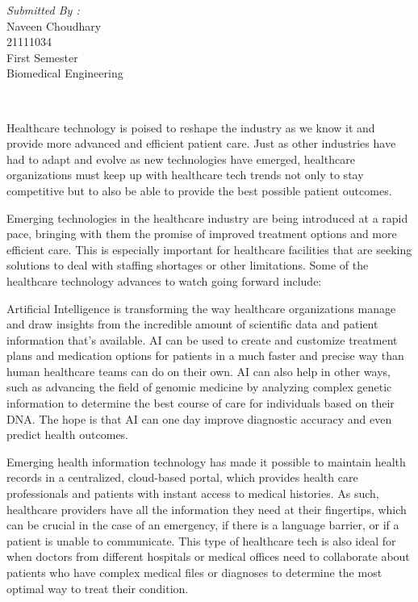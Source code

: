 \documentclass[12pt]{article}
\begin{document}
\begin{titlepage}
\begin{minipage}{0.4\textwidth}
			\begin{flushright} \large
			\emph{Submitted By :} \\
			Naveen Choudhary\\
            21111034\\
        First Semester\\
        Biomedical Engineering\\
		\end{flushright}
        
	\end{minipage}\\[2 cm]
	

\end{titlepage}

\newpage

Healthcare technology is poised to reshape the industry as we know it and provide more advanced and efficient patient care. Just as other industries have had to adapt and evolve as new technologies have emerged, healthcare organizations must keep up with healthcare tech trends not only to stay competitive but to also be able to provide the best possible patient outcomes.

\indent

Emerging technologies in the healthcare industry are being introduced at a rapid pace, bringing with them the promise of improved treatment options and more efficient care. This is especially important for healthcare facilities that are seeking solutions to deal with staffing shortages or other limitations. Some of the healthcare technology advances to watch going forward include:

\indent

Artificial Intelligence is transforming the way healthcare organizations manage and draw insights from the incredible amount of scientific data and patient information that’s available. AI can be used to create and customize treatment plans and medication options for patients in a much faster and precise way than human healthcare teams can do on their own. AI can also help in other ways, such as advancing the field of genomic medicine by analyzing complex genetic information to determine the best course of care for individuals based on their DNA. The hope is that AI can one day improve diagnostic accuracy and even predict health outcomes.

\indent

Emerging health information technology has made it possible to maintain health records in a centralized, cloud-based portal, which provides health care professionals and patients with instant access to medical histories. As such, healthcare providers have all the information they need at their fingertips, which can be crucial in the case of an emergency, if there is a language barrier, or if a patient is unable to communicate. This type of healthcare tech is also ideal for when doctors from different hospitals or medical offices need to collaborate about patients who have complex medical files or diagnoses to determine the most optimal way to treat their condition.
\end{document}
